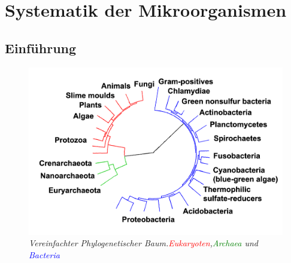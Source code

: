 
\section{Systematik der Mikroorganismen}
\subsection{Einführung}

	\begin{figure}[ht!]
	\leavevmode
	\begin{center}
		\includegraphics[scale=0.87]{./pictures/phyltree}
	\end{center}
	\caption{\slshape{Vereinfachter Phylogenetischer Baum.\textcolor{red}{Eukaryoten},\textcolor{green}{Archaea} und \textcolor{blue}{Bacteria}}}
	\label{fig:phyltree}
	\end{figure}

